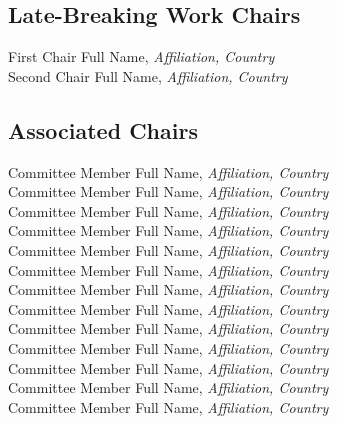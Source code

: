 
\subsection{Late-Breaking Work Chairs}
First Chair Full Name, \emph{Affiliation, Country}\\
Second Chair Full Name, \emph{Affiliation, Country}



\subsection{Associated Chairs}
Committee Member Full Name, \emph{Affiliation, Country}\\
Committee Member Full Name, \emph{Affiliation, Country}\\
Committee Member Full Name, \emph{Affiliation, Country}\\
Committee Member Full Name, \emph{Affiliation, Country}\\
Committee Member Full Name, \emph{Affiliation, Country}\\
Committee Member Full Name, \emph{Affiliation, Country}\\
Committee Member Full Name, \emph{Affiliation, Country}\\
Committee Member Full Name, \emph{Affiliation, Country}\\
Committee Member Full Name, \emph{Affiliation, Country}\\
Committee Member Full Name, \emph{Affiliation, Country}\\
Committee Member Full Name, \emph{Affiliation, Country}\\
Committee Member Full Name, \emph{Affiliation, Country}\\
Committee Member Full Name, \emph{Affiliation, Country}\\

